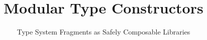 \documentclass[9pt,preprint]{sigplanconf}
\begin{document}
\conferenceinfo{-}{-} 
\copyrightyear{-} 
\copyrightdata{[to be supplied]} 



\title{Modular Type Constructors}
\subtitle{Type System Fragments as Safely Composable Libraries}
\authorinfo{}{}{}

\maketitle
\end{document}
